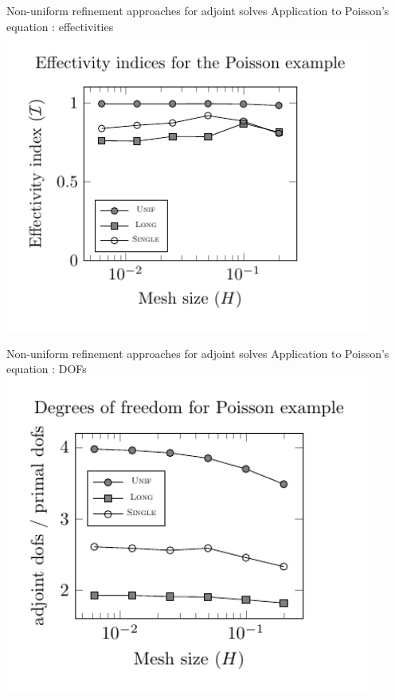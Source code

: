 \documentclass[fleqn]{beamer}
\begin{document}

\begin{frame}{Non-uniform refinement approaches for adjoint solves}
{Application to Poisson's equation : effectivities}
\centering
\includegraphics[width=0.9\textwidth]{../img/refine_poisson_effectivity}
\end{frame}


\begin{frame}{Non-uniform refinement approaches for adjoint solves}
{Application to Poisson's equation : DOFs}
\centering
\includegraphics[width=0.9\textwidth]{../img/refine_poisson_dofs}
\end{frame}
\end{document}

